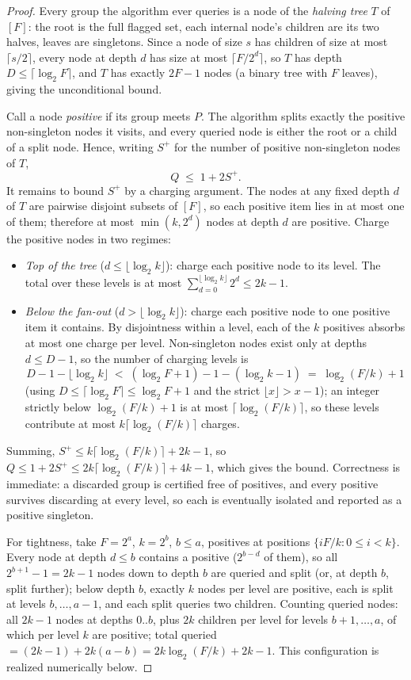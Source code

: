 \documentclass[11pt,a4paper]{article}
\begin{document}
\begin{proof}
Every group the algorithm ever queries is a node of the \emph{halving tree} $T$ of $[F]$: the root is the full flagged set, each internal node's children are its two halves, leaves are singletons. Since a node of size $s$ has children of size at most $\lceil s/2\rceil$, every node at depth $d$ has size at most $\lceil F/2^d\rceil$, so $T$ has depth $D\le\lceil\log_2 F\rceil$, and $T$ has exactly $2F-1$ nodes (a binary tree with $F$ leaves), giving the unconditional bound.

Call a node \emph{positive} if its group meets $P$. The algorithm splits exactly the positive non-singleton nodes it visits, and every queried node is either the root or a child of a split node. Hence, writing $S^{+}$ for the number of positive non-singleton nodes of $T$,
\[
Q\;\le\;1+2S^{+}.
\]
It remains to bound $S^{+}$ by a charging argument. The nodes at any fixed depth $d$ of $T$ are pairwise disjoint subsets of $[F]$, so each positive item lies in at most one of them; therefore at most $\min(k,2^d)$ nodes at depth $d$ are positive. Charge the positive nodes in two regimes:
\begin{itemize}[leftmargin=1.6em]
\item \emph{Top of the tree} ($d\le\lfloor\log_2 k\rfloor$): charge each positive node to its level. The total over these levels is at most $\sum_{d=0}^{\lfloor\log_2 k\rfloor}2^d\le 2k-1$.
\item \emph{Below the fan-out} ($d>\lfloor\log_2 k\rfloor$): charge each positive node to one positive item it contains. By disjointness within a level, each of the $k$ positives absorbs at most one charge per level. Non-singleton nodes exist only at depths $d\le D-1$, so the number of charging levels is
\[
D-1-\lfloor\log_2 k\rfloor \;<\; (\log_2 F+1)-1-(\log_2 k-1)\;=\;\log_2(F/k)+1
\]
(using $D\le\lceil\log_2 F\rceil\le\log_2 F+1$ and the strict $\lfloor x\rfloor>x-1$); an integer strictly below $\log_2(F/k)+1$ is at most $\lceil\log_2(F/k)\rceil$, so these levels contribute at most $k\lceil\log_2(F/k)\rceil$ charges.
\end{itemize}
Summing, $S^{+}\le k\lceil\log_2(F/k)\rceil+2k-1$, so $Q\le 1+2S^{+}\le 2k\lceil\log_2(F/k)\rceil+4k-1$, which gives the bound. Correctness is immediate: a discarded group is certified free of positives, and every positive survives discarding at every level, so each is eventually isolated and reported as a positive singleton.

For tightness, take $F=2^a$, $k=2^b$, $b\le a$, positives at positions $\{iF/k:0\le i<k\}$. Every node at depth $d\le b$ contains a positive ($2^{b-d}$ of them), so all $2^{b+1}-1=2k-1$ nodes down to depth $b$ are queried and split (or, at depth $b$, split further); below depth $b$, exactly $k$ nodes per level are positive, each is split at levels $b,\dots,a-1$, and each split queries two children. Counting queried nodes: all $2k-1$ nodes at depths $0..b$, plus $2k$ children per level for levels $b{+}1,\dots,a$, of which per level $k$ are positive; total queried $=(2k-1)+2k(a-b)=2k\log_2(F/k)+2k-1$. This configuration is realized numerically below.
\end{proof}
\end{document}
